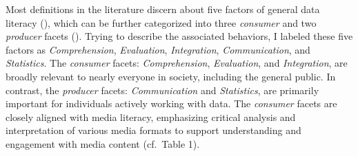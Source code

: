 \documentclass[
  12pt,
  a4paper,
  twoside]{article}
\begin{document}
Most definitions in the literature discern about five factors of general data literacy (), which can be further categorized into three \emph{consumer} and two \emph{producer} facets (). Trying to describe the associated behaviors, I labeled these five factors as \emph{Comprehension}, \emph{Evaluation}, \emph{Integration}, \emph{Communication}, and \emph{Statistics}. The \emph{consumer} facets: \emph{Comprehension}, \emph{Evaluation}, and \emph{Integration}, are broadly relevant to nearly everyone in society, including the general public. In contrast, the \emph{producer} facets: \emph{Communication} and \emph{Statistics}, are primarily important for individuals actively working with data. The \emph{consumer} facets are closely aligned with media literacy, emphasizing critical analysis and interpretation of various media formats to support understanding and engagement with media content (cf.~Table 1).
\end{document}

